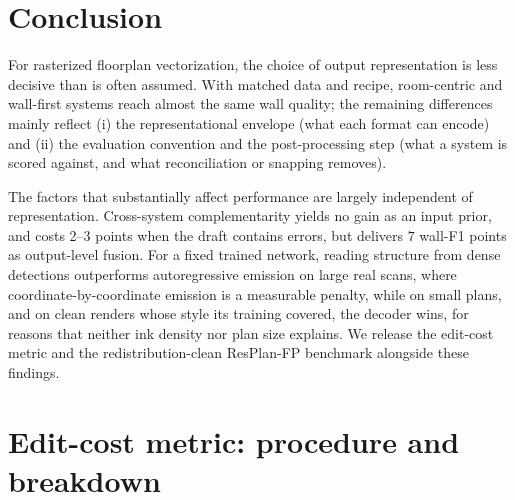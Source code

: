\documentclass{article}
\begin{document}
\section{Conclusion}
For rasterized floorplan vectorization, the choice of output representation is
less decisive than is often assumed. With matched data and recipe, room-centric
and wall-first systems reach almost the same wall quality; the remaining
differences mainly reflect (i) the representational envelope (what each format
can encode) and (ii) the evaluation convention and the post-processing step
(what a system is scored against, and what reconciliation or snapping
removes).

The factors that substantially affect performance are largely independent of
representation. Cross-system complementarity yields no gain as an input
prior, and costs 2--3 points when the draft contains errors, but delivers
$7$ wall-F1 points as output-level fusion. For a fixed trained network, reading
structure from dense detections outperforms autoregressive emission on large
real scans, where coordinate-by-coordinate emission is a measurable penalty,
while on small plans, and on clean renders whose style its training covered,
the decoder wins, for reasons that neither ink density nor plan size
explains. We release the edit-cost metric and the redistribution-clean
ResPlan-FP benchmark alongside these findings.

\appendix
\section{Edit-cost metric: procedure and breakdown}\label{app:edit}
\end{document}

